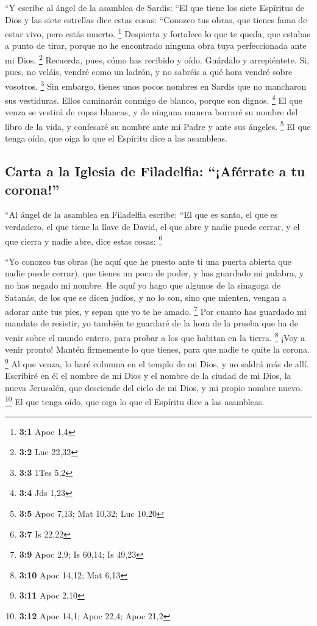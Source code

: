  ``Y escribe al ángel de la asamblea de Sardis: ``El que
tiene los siete Espíritus de Dios y las siete estrellas dice estas
cosas: ``Conozco tus obras, que tienes fama de estar vivo, pero estás
muerto. \footnote{\textbf{3:1} Apoc 1,4}  Despierta y
fortalece lo que te queda, que estabas a punto de tirar, porque no he
encontrado ninguna obra tuya perfeccionada ante mi Dios. \footnote{\textbf{3:2}
  Luc 22,32}  Recuerda, pues, cómo has recibido y oído.
Guárdalo y arrepiéntete. Si, pues, no veláis, vendré como un ladrón, y
no sabréis a qué hora vendré sobre vosotros. \footnote{\textbf{3:3} 1Tes
  5,2}  Sin embargo, tienes unos pocos nombres en Sardis
que no mancharon sus vestiduras. Ellos caminarán conmigo de blanco,
porque son dignos. \footnote{\textbf{3:4} Jds 1,23}  El
que venza se vestirá de ropas blancas, y de ninguna manera borraré su
nombre del libro de la vida, y confesaré su nombre ante mi Padre y ante
sus ángeles. \footnote{\textbf{3:5} Apoc 7,13; Mat 10,32; Luc 10,20}
 El que tenga oído, que oiga lo que el Espíritu dice a las
asambleas.

\hypertarget{carta-a-la-iglesia-de-filadelfia-afuxe9rrate-a-tu-corona}{%
\subsection{Carta a la Iglesia de Filadelfia: ``¡Aférrate a tu
corona!''}\label{carta-a-la-iglesia-de-filadelfia-afuxe9rrate-a-tu-corona}}

 ``Al ángel de la asamblea en Filadelfia escribe: ``El que
es santo, el que es verdadero, el que tiene la llave de David, el que
abre y nadie puede cerrar, y el que cierra y nadie abre, dice estas
cosas: \footnote{\textbf{3:7} Is 22,22}

 ``Yo conozco tus obras (he aquí que he puesto ante ti una
puerta abierta que nadie puede cerrar), que tienes un poco de poder, y
has guardado mi palabra, y no has negado mi nombre.  He
aquí yo hago que algunos de la sinagoga de Satanás, de los que se dicen
judíos, y no lo son, sino que mienten, vengan a adorar ante tus pies, y
sepan que yo te he amado. \footnote{\textbf{3:9} Apoc 2,9; Is 60,14; Is
  49,23}  Por cuanto has guardado mi mandato de resistir,
yo también te guardaré de la hora de la prueba que ha de venir sobre el
mundo entero, para probar a los que habitan en la tierra. \footnote{\textbf{3:10}
  Apoc 14,12; Mat 6,13}  ¡Voy a venir pronto! Mantén
firmemente lo que tienes, para que nadie te quite la corona. \footnote{\textbf{3:11}
  Apoc 2,10}  Al que venza, lo haré columna en el templo
de mi Dios, y no saldrá más de allí. Escribiré en él el nombre de mi
Dios y el nombre de la ciudad de mi Dios, la nueva Jerusalén, que
desciende del cielo de mi Dios, y mi propio nombre nuevo. \footnote{\textbf{3:12}
  Apoc 14,1; Apoc 22,4; Apoc 21,2}  El que tenga oído,
que oiga lo que el Espíritu dice a las asambleas.

